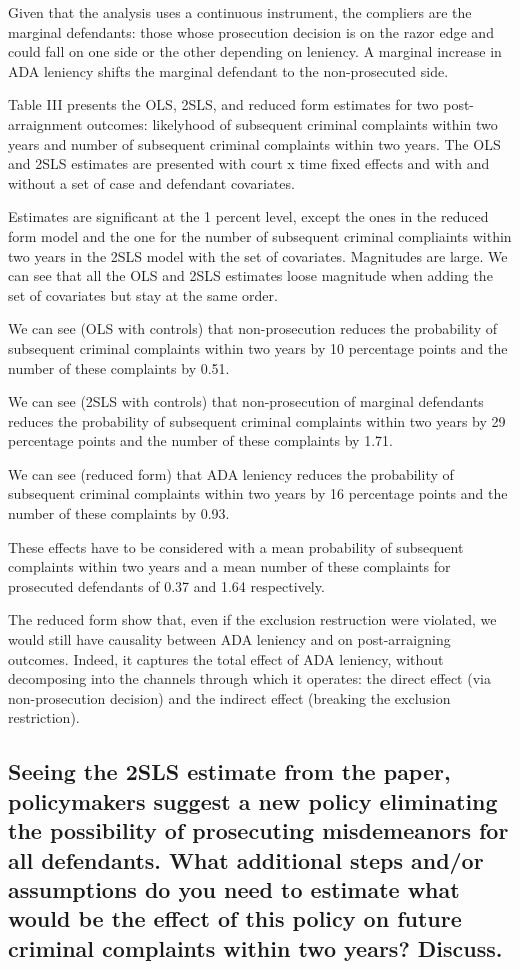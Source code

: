 \documentclass{article}
\begin{document}
Given that the analysis uses a continuous instrument, the compliers are the marginal defendants: those whose prosecution decision is on the razor edge and could fall on one side or the other depending on leniency. A marginal increase in ADA leniency shifts the marginal defendant to the non-prosecuted side.

Table III presents the OLS, 2SLS, and reduced form estimates for two post-arraignment outcomes: likelyhood of subsequent criminal complaints within two years and number of subsequent criminal complaints within two years. The OLS and 2SLS estimates are presented with court x time fixed effects and with and without a set of case and defendant covariates.

Estimates are significant at the 1 percent level, except the ones in the reduced form model and the one for the number of subsequent criminal compliaints within two years in the 2SLS model with the set of covariates. Magnitudes are large. We can see that all the OLS and 2SLS estimates loose magnitude when adding the set of covariates but stay at the same order.

We can see (OLS with controls) that non-prosecution reduces the probability of subsequent criminal complaints within two years by 10 percentage points and the number of these complaints by 0.51.

We can see (2SLS with controls) that non-prosecution of marginal defendants reduces the probability of subsequent criminal complaints within two years by 29 percentage points and the number of these complaints by 1.71.

We can see (reduced form) that ADA leniency reduces the probability of subsequent criminal complaints within two years by 16 percentage points and the number of these complaints by 0.93.

These effects have to be considered with a mean probability of subsequent complaints within two years and a mean number of these complaints for prosecuted defendants of 0.37 and 1.64 respectively.

The reduced form show that, even if the exclusion restruction were violated, we would still have causality between ADA leniency and on post-arraigning outcomes. Indeed, it captures the total effect of ADA leniency, without decomposing into the channels through which it operates: the direct effect (via non-prosecution decision) and the indirect effect (breaking the exclusion restriction).

\subsection{Seeing the 2SLS estimate from the paper, policymakers suggest a new policy eliminating the possibility of prosecuting misdemeanors for all defendants. What additional steps and/or assumptions do you need to estimate what would be the effect of this policy on future criminal complaints within two years? Discuss.}
\end{document}
